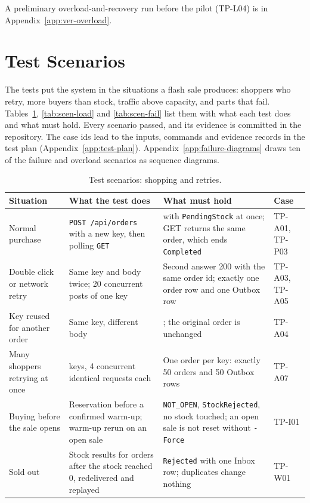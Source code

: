 \documentclass[a4paper]{report}
\begin{document}
A preliminary overload-and-recovery run before the pilot (TP-L04) is in Appendix~\ref{app:ver-overload}.

\section{Test Scenarios}
\label{sec:test-scenarios}
The tests put the system in the situations a flash sale produces: shoppers who
retry, more buyers than stock, traffic above capacity, and parts that fail.
Tables~\ref{tab:scen-shop}, \ref{tab:scen-load} and \ref{tab:scen-fail} list
them with what each test does and what must hold. Every scenario passed, and
its evidence is committed in the repository. The case ids lead to the inputs,
commands and evidence records in the test plan (Appendix~\ref{app:test-plan}).
Appendix~\ref{app:failure-diagrams} draws ten of the
failure and overload scenarios as sequence diagrams.

\begin{table}[!htbp]
\centering
\footnotesize
\renewcommand{\arraystretch}{1.15}
\begin{tabular}{@{}>{\raggedright\arraybackslash}p{}>{\raggedright\arraybackslash}p{}>{\raggedright\arraybackslash}p{}>{\raggedright\arraybackslash}p{}@{}}
\toprule
Situation & What the test does & What must hold & Case \\
\midrule
Normal purchase & \texttt{POST /api/orders} with a new key, then polling \texttt{GET} & 201 with \texttt{PendingStock} at once; GET returns the same order, which ends \texttt{Completed} & TP-A01, TP-P03 \\
Double click or network retry & Same key and body twice; 20 concurrent posts of one key & Second answer 200 with the same order id; exactly one order row and one Outbox row & TP-A03, TP-A05 \\
Key reused for another order & Same key, different body & 409; the original order is unchanged & TP-A04 \\
Many shoppers retrying at once & 50 keys, 4 concurrent identical requests each & One order per key: exactly 50 orders and 50 Outbox rows & TP-A07 \\
Buying before the sale opens & Reservation before a confirmed warm-up; warm-up rerun on an open sale & \texttt{NOT\_OPEN}, \texttt{StockRejected}, no stock touched; an open sale is not reset without \texttt{-Force} & TP-I01 \\
Sold out & Stock results for orders after the stock reached 0, redelivered and replayed & \texttt{Rejected} with one Inbox row; duplicates change nothing & TP-W01 \\
\bottomrule
\end{tabular}
\caption{Test scenarios: shopping and retries.}
\label{tab:scen-shop}
\end{table}
\end{document}
